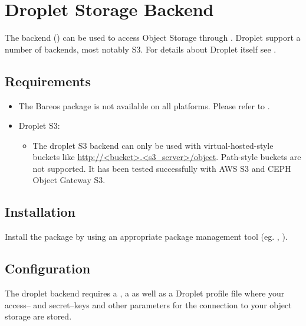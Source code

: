 \section{Droplet Storage Backend}
\label{SdBackendDroplet}

The  backend () can be used to access Object Storage through .
Droplet support a number of backends, most notably S3.
For details about Droplet itself see \externalReferenceDroplet.

\subsection{Requirements}

\begin{itemize}
  \item The Bareos package  is not available on all platforms. Please refer to .
  \item Droplet S3:
  \begin{itemize}
    \item The droplet S3 backend can only be used with virtual-hosted-style buckets like \url{http://<bucket>.<s3_server>/object}.
        Path-style buckets are not supported.
        It has  been tested successfully with AWS S3 and CEPH Object Gateway S3.
  \end{itemize}
\end{itemize}


\subsection{Installation}

Install the package 
by using an appropriate package management tool
(eg. , ).





\subsection{Configuration}
The droplet backend requires a \bareosDir {}, a \bareosSd {} as well as a Droplet profile file where your access-- and secret--keys and other parameters for the connection to your object storage are stored.


